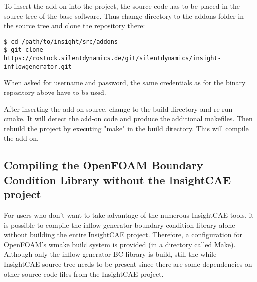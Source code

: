 \documentclass{sd_report}
\begin{document}
 
To insert the add-on into the \is project, the source code has to be placed in the source tree of the \is base software.
Thus change directory to the addons folder in the source tree and clone the repository there:
\begin{lstlisting}
$ cd /path/to/insight/src/addons
$ git clone https://rostock.silentdynamics.de/git/silentdynamics/insight-inflowgenerator.git
\end{lstlisting}
When asked for username and password, the same credentials as for the binary repository above have to be used.

After inserting the add-on source, change to the build directory and re-run cmake.
It will detect the add-on code and produce the additional makefiles.
Then rebuild the \is project by executing "make" in the build directory. This will compile the add-on.

\subsection{Compiling the OpenFOAM Boundary Condition Library without the InsightCAE project}

For users who don't want to take advantage of the numerous InsightCAE tools, it is possible to compile the inflow generator boundary condition library alone without building the entire InsightCAE project.
Therefore, a configuration for OpenFOAM's wmake build system is provided (in a directory called Make).
Although only the inflow generator BC library is build, still the while InsightCAE source tree needs to be present since there are some dependencies on other source code files from the InsightCAE project.
\end{document}

